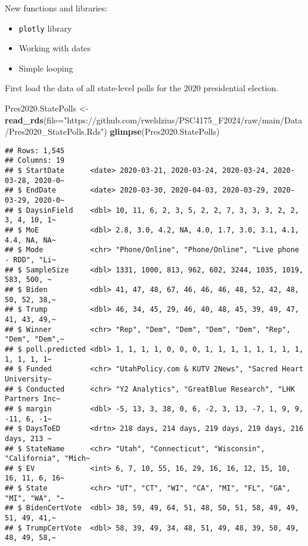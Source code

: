 \documentclass[
]{article}
\newenvironment{Shaded}{\begin{snugshade}}{\end{snugshade}}
\newcommand{\AttributeTok}[1]{\textcolor[rgb]{0.13,0.29,0.53}{#1}}
\newcommand{\FunctionTok}[1]{\textcolor[rgb]{0.13,0.29,0.53}{\textbf{#1}}}
\newcommand{\NormalTok}[1]{#1}
\newcommand{\OtherTok}[1]{\textcolor[rgb]{0.56,0.35,0.01}{#1}}
\newcommand{\StringTok}[1]{\textcolor[rgb]{0.31,0.60,0.02}{#1}}
\providecommand{\tightlist}{%
  \setlength{\itemsep}{0pt}\setlength{\parskip}{0pt}}
\begin{document}
New functions and libraries:

\begin{itemize}
\tightlist
\item
  \texttt{plotly} library
\item
  Working with dates
\item
  Simple looping
\end{itemize}

First load the data of all state-level polls for the 2020 presidential
election.

\begin{Shaded}
\begin{Highlighting}[]
\NormalTok{Pres2020.StatePolls }\OtherTok{\textless{}{-}} \FunctionTok{read\_rds}\NormalTok{(}\AttributeTok{file=}\StringTok{"https://github.com/rweldzius/PSC4175\_F2024/raw/main/Data/Pres2020\_StatePolls.Rds"}\NormalTok{)}
\FunctionTok{glimpse}\NormalTok{(Pres2020.StatePolls)}
\end{Highlighting}
\end{Shaded}

\begin{verbatim}
## Rows: 1,545
## Columns: 19
## $ StartDate      <date> 2020-03-21, 2020-03-24, 2020-03-24, 2020-03-28, 2020-0~
## $ EndDate        <date> 2020-03-30, 2020-04-03, 2020-03-29, 2020-03-29, 2020-0~
## $ DaysinField    <dbl> 10, 11, 6, 2, 3, 5, 2, 2, 7, 3, 3, 3, 2, 2, 3, 4, 10, 1~
## $ MoE            <dbl> 2.8, 3.0, 4.2, NA, 4.0, 1.7, 3.0, 3.1, 4.1, 4.4, NA, NA~
## $ Mode           <chr> "Phone/Online", "Phone/Online", "Live phone - RDD", "Li~
## $ SampleSize     <dbl> 1331, 1000, 813, 962, 602, 3244, 1035, 1019, 583, 500, ~
## $ Biden          <dbl> 41, 47, 48, 67, 46, 46, 46, 48, 52, 42, 48, 50, 52, 38,~
## $ Trump          <dbl> 46, 34, 45, 29, 46, 40, 48, 45, 39, 49, 47, 41, 43, 49,~
## $ Winner         <chr> "Rep", "Dem", "Dem", "Dem", "Dem", "Rep", "Dem", "Dem",~
## $ poll.predicted <dbl> 1, 1, 1, 1, 0, 0, 0, 1, 1, 1, 1, 1, 1, 1, 1, 1, 1, 1, 1~
## $ Funded         <chr> "UtahPolicy.com & KUTV 2News", "Sacred Heart University~
## $ Conducted      <chr> "Y2 Analytics", "GreatBlue Research", "LHK Partners Inc~
## $ margin         <dbl> -5, 13, 3, 38, 0, 6, -2, 3, 13, -7, 1, 9, 9, -11, 6, -1~
## $ DaysToED       <drtn> 218 days, 214 days, 219 days, 219 days, 216 days, 213 ~
## $ StateName      <chr> "Utah", "Connecticut", "Wisconsin", "California", "Mich~
## $ EV             <int> 6, 7, 10, 55, 16, 29, 16, 16, 12, 15, 10, 16, 11, 6, 16~
## $ State          <chr> "UT", "CT", "WI", "CA", "MI", "FL", "GA", "MI", "WA", "~
## $ BidenCertVote  <dbl> 38, 59, 49, 64, 51, 48, 50, 51, 58, 49, 49, 51, 49, 41,~
## $ TrumpCertVote  <dbl> 58, 39, 49, 34, 48, 51, 49, 48, 39, 50, 49, 48, 49, 58,~
\end{verbatim}
\end{document}
